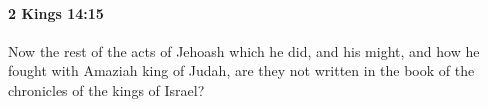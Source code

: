 
		\paragraph{2 Kings 14:15} %
			\label{2KINGS-14-15}

			Now the rest of the acts of Jehoash which he did, and his might, and how he fought with Amaziah king of Judah, are they not written in the book of the chronicles of the kings of Israel?


